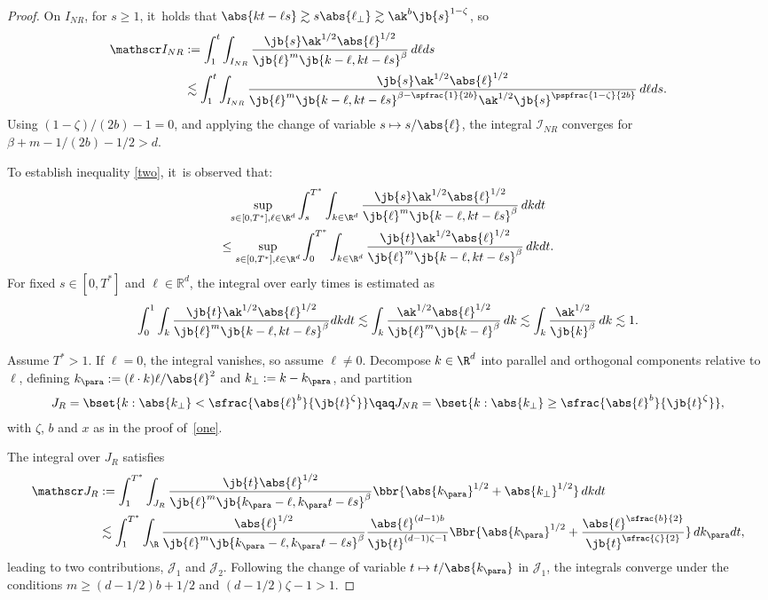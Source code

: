 \begin{proof}
On $I_{NR}$, for $s\geq1$, it~holds that $\abs{kt-\ell s }\gtrsim s \abs{\ell_\perp}\gtrsim\ak^b\jb{ s }^{1-\zeta}$, so
\begin{align*}
\mathscr I_{NR}&:=\int_1^t\int_{I_{NR}}\frac{\jb{ s }\ak^{1/2}\abs{\ell}^{1/2}}{\jb{\ell}^m\jb{k-\ell,kt-\ell s}^{\beta}}\,d\ell d s \\
&\lesssim\int_1^t\int_{I_{NR}}\frac{\jb{s}\ak^{1/2}\abs{\ell}^{1/2}}{\jb{\ell}^m\jb{k-\ell,kt-\ell s}^{\beta-\spfrac{1}{2b}}\ak^{1/2}\jb{s}^{\pspfrac{1-\zeta}{2b}}}\,d\ell d s .
\end{align*}
Using $(1-\zeta)/(2b)-1=0$, and applying the change of variable $s\mapsto s/\abs{\ell}$, the integral $\mathscr I_{NR}$ converges for $\beta+m-1/(2b)-1/2>d$.

\pagebreak[2]
To establish inequality \eqref{two}, it~is observed that:
\begin{multline*}
\sup_{s\in[0,T^*],\ell\in\R^d}\int_{s}^{T^*}\int_{k\in\R^d}\frac{\jb{ s }\ak^{1/2}\abs{\ell}^{1/2}}{\jb{\ell}^m\jb{k-\ell,kt-\ell s }^{\beta}}\,dk d t \\
\leq \sup_{s\in[0,T^*],\ell\in\R^d}\int_{0}^{T^*}\int_{k\in\R^d}\frac{\jb{t }\ak^{1/2}\abs{\ell}^{1/2}}{\jb{\ell}^m\jb{k-\ell,kt-\ell s }^{\beta}}\,dk d t.
\end{multline*}
For fixed $s \in [0, T^*]$ and $\ell \in \mathbb{R}^d$, the integral over early times is estimated as
\begin{align*}
\int_{0}^{1}\int_{k}\frac{\jb{t }\ak^{1/2}\abs{\ell}^{1/2}}{\jb{\ell}^m\jb{k-\ell,kt-\ell s }^{\beta}}dk d t\lesssim\int_k\frac{\ak^{1/2}\abs{\ell}^{1/2}}{\jb{\ell}^m\jb{k-\ell}^{\beta}}\,dk\lesssim\int_k\frac{\ak^{1/2}}{\jb{k}^{\beta}}\,dk\lesssim1.
\end{align*}

Assume $T^* > 1$. If $\ell=0$, the integral vanishes, so assume $\ell\neq0$. Decompose $k\in\R^d$ into parallel and orthogonal components relative to $\ell$, defining $k_\para:=(\ell\cdot k)\ell/\abs{\ell}^2$ and $k_\perp:=k-k_\para$, and partition
\begin{align*}
J_R=\bset{k:\abs{k_\perp}<\sfrac{\abs{\ell}^b}{\jb{ t }^\zeta}}\qaq J_{NR}=\bset{k:\abs{k_\perp}\geq\sfrac{\abs{\ell}^b}{\jb{ t }^\zeta}},
\end{align*}with $\zeta$, $b$ and $x$ as in the proof of~\eqref{one}.

The integral over $J_R$ satisfies
\begin{align*}
\mathscr J_{R}&:=\int_1^{T^*}\int_{J_{R}} \frac{\jb{t}\abs{\ell}^{1/2}}{\jb{\ell}^m\jb{k_\para-\ell,k_\para t-\ell s}^\beta}\bbr{\abs{k_\para}^{1/2}+\abs{k_\perp}^{1/2}}\,dk dt\\
&\lesssim\int_1^{T^*}\int_{\R} \frac{\abs{\ell}^{1/2}}{\jb{\ell}^m\jb{k_\para-\ell,k_\para t-\ell s}^\beta}\frac{\abs{\ell}^{(d-1)b}}{\jb{t}^{(d-1)\zeta-1}}\Bbr{\abs{k_\para}^{1/2}+\frac{\abs{\ell}^{\sfrac{b}{2}}}{\jb{t}^{\sfrac{\zeta}{2}}}}\,dk_\para dt,
\end{align*}
leading to two contributions, $\mathscr J_1$ and $\mathscr J_2$. Following the change of variable $t\mapsto t/\abs{k_\para}$ in $\mathscr J_1$, the integrals converge under the conditions $m\geq(d-1/2)b+1/2$ and $(d-1/2)\zeta - 1 > 1$.


\end{proof}
